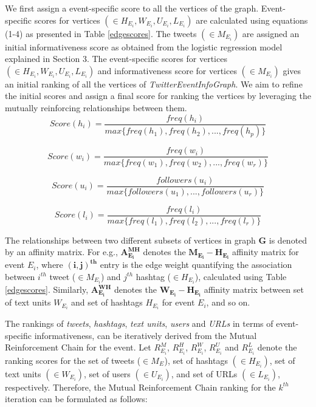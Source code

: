 We first assign a event-specific score to all the vertices of the graph. Event-specific scores for vertices $(\in H_{E_{i}}, W_{E_{i}}, U_{E_{i}}, L_{E_{i}})$ are calculated using equations (1-4) as presented in Table \ref{edgescores}. The tweets  $(\in M_{E_{i}})$ are assigned an initial informativeness score as obtained from the logistic regression model explained in Section 3. The event-specific scores for vertices $(\in H_{E_{i}}, W_{E_{i}}, U_{E_{i}}, L_{E_{i}})$ and informativeness score for vertices $(\in M_{E_{i}})$ gives an initial ranking of all the vertices of \textit{TwitterEventInfoGraph}. We aim to refine the initial scores and assign a final score for ranking the vertices by leveraging the mutually reinforcing relationships between them.
\begin{equation}
Score(h_{i}) = \frac{freq(h_{i})}{max\{freq(h_{1}),freq(h_{2}),...,freq(h_{p})\}}
\end{equation}

\begin{equation}
Score(w_{i}) = \frac{freq(w_{i})}{max\{freq(w_{1}),freq(w_{2}),...,freq(w_{r})\}}
\end{equation}

\begin{equation}
Score(u_{i}) = \frac{followers(u_{i})}{max\{followers(u_{1}),...,followers(u_{r})\}}
\end{equation}

\begin{equation}
Score(l_{i}) = \frac{freq(l_{i})}{max\{freq(l_{1}),freq(l_{2}),...,freq(l_{r})\}}
\end{equation}


The relationships between two different subsets of vertices in graph $\scriptstyle \mathbf{G}$ is denoted by an affinity matrix. For e.g., $\mathbf{A_{E_{i}}^{MH}}$ denotes the $\mathbf{M_{E_{i}}-H_{E_{i}}}$ affinity matrix for event $E_{i}$, where $\mathbf{(i,j)^{th}}$ entry is the edge weight quantifying the association between $i^{th}$ tweet ($\in M_{E_{i}}$) and $j^{th}$ hashtag ($\in H_{E_{i}}$), calculated using Table \ref{edgescores}. Similarly, $\mathbf{A_{E_{i}}^{WH}}$ denotes the $\mathbf{W_{E_{i}}-H_{E_{i}}}$ affinity matrix between set of text units $W_{E_{i}}$ and set of hashtags $H_{E_{i}}$ for event $E_{i}$, and so on.


The rankings of \textit{tweets}, \textit{hashtags}, \textit{text units}, \textit{users} and \textit{URLs} in terms of event-specific informativeness, can be iteratively derived from the Mutual Reinforcement Chain for the event. Let $R_{{E_{i}}}^{M}$, $R_{{E_{i}}}^{H}$, $R_{{E_{i}}}^{W}$, $R_{{E_{i}}}^{U}$ and $\scriptstyle R_{{E_{i}}}^{L}$ denote the ranking scores for the set of tweets ($\in M_{E_{}}$), set of  hashtags $(\in H_{E_{i}})$, set of text units $(\in W_{E_{i}})$, set of users $(\in U_{E_{i}})$, and set of URLs $(\in L_{E_{i}})$, respectively. Therefore, the Mutual Reinforcement Chain ranking for the $k^{th}$ iteration can be formulated as follows:
 

